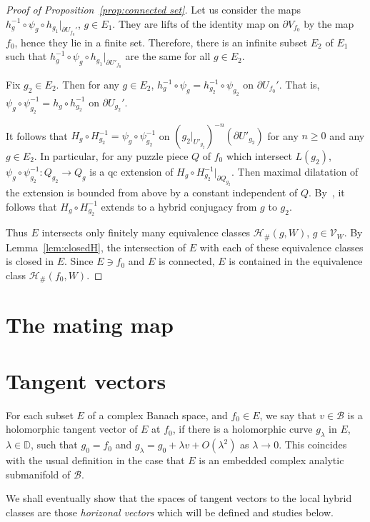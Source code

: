 \documentclass{amsart}
\numberwithin{equation}{section}
\theoremstyle{definition}
\theoremstyle{remark}
\begin{document}
\begin{proof}[Proof of Proposition~\ref{prop:connected set}]
Let us consider the maps $h_{g}^{-1}\circ \psi_g\circ h_{g_1}|_{\partial U_{f_0}'}$, $g\in E_1$. They are lifts of the identity map on $\partial V_{f_0}$ by the map $f_0$, hence they lie in a finite set. Therefore, there is an infinite subset $E_2$ of $E_1$ such that $h_g^{-1}\circ \psi_g\circ h_{g_1}|_{\partial U'_{f_0}}$ are the same for all $g\in E_2$. 

Fix $g_2\in E_2$. Then for any $g\in E_2$, $h_g^{-1}\circ \psi_g=h_{g_2}^{-1}\circ \psi_{g_2}$ on $\partial U_{f_0}'$. That is, $\psi_g\circ \psi_{g_2}^{-1}=h_g\circ h_{g_2}^{-1}$ on $\partial U_{g_2}'$.  

It follows that $H_g\circ H_{g_2}^{-1}=\psi_{g}\circ \psi_{g_2}^{-1}$ on $(g_2|_{U'_{g_2}})^{-n}(\partial U'_{g_2})$ for any $n\ge 0$ and any $g\in E_2$.
In particular, for any puzzle piece $Q$ of $f_0$ which intersect $L(g_2)$, $\psi_g\circ \psi_{g_2}^{-1}:Q_{g_2}\to Q_g$ is a qc extension of $H_g\circ H_{g_2}^{-1}|_{\partial Q_{g_2}}$. Then maximal dilatation of the extension is bounded from above by a constant independent of $Q$. By~\cite[Theorem 1.3]{PT}, it follows that $H_g\circ H_{g_2}^{-1}$ extends to a hybrid conjugacy from $g$ to $g_2$. 

Thus $E$ intersects only finitely many equivalence classes $\mathcal{H}_\#(g, W)$, $g\in \mathcal{V}_W$. By Lemma~\ref{lem:closedH}, the intersection of $E$ with each of these equivalence classes is closed in $E$. Since $E\ni f_0$ and $E$ is connected, $E$ is contained in the equivalence class $\mathcal{H}_{\#} (f_0, W)$.  
\end{proof}
\iffalse
\section{The mating map}
\section{Tangent vectors}
For each subset $E$ of a complex Banach space, and $f_0\in E$, we say that $v\in \mathcal{B}$ is a holomorphic tangent vector of $E$ at $f_0$, if there is a holomorphic curve $g_\lambda$ in $E$, $\lambda\in \mathbb{D}$, such that $g_0=f_0$ and $g_\lambda=g_0+\lambda v+ O(\lambda^2)$ as $\lambda\to 0$. This coincides with the usual definition in the case that $E$ is an embedded complex analytic submanifold of $\mathcal{B}$. 

We shall eventually show that the spaces of tangent vectors to the local hybrid classes are those {\em horizonal vectors} which will be defined and studies below. 
\end{document}
